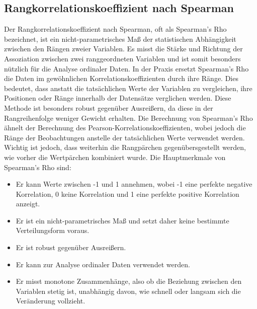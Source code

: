 \subsection{Rangkorrelationskoeffizient nach Spearman}
Der Rangkorrelationskoeffizient nach Spearman, oft als Spearman's Rho bezeichnet, ist ein nicht-parametrisches Maß der statistischen Abhängigkeit zwischen den Rängen zweier Variablen.
Es misst die Stärke und Richtung der Assoziation zwischen zwei ranggeordneten Variablen und ist somit besonders nützlich für die Analyse ordinaler Daten.
\newline
In der Praxis ersetzt Spearman's Rho die Daten im gewöhnlichen Korrelationskoeffizienten durch ihre Ränge.
Dies bedeutet, dass anstatt die tatsächlichen Werte der Variablen zu vergleichen, ihre Positionen oder Ränge innerhalb der Datensätze verglichen werden.
Diese Methode ist besonders robust gegenüber Ausreißern, da diese in der Rangreihenfolge weniger Gewicht erhalten.
\newline
Die Berechnung von Spearman's Rho ähnelt der Berechnung des Pearson-Korrelationskoeffizienten, wobei jedoch die Ränge der Beobachtungen anstelle der tatsächlichen Werte verwendet werden.
Wichtig ist jedoch, dass weiterhin die Rangpärchen gegenübersgestellt werden, wie vorher die Wertpärchen kombiniert wurde.
\newline \newline
Die Hauptmerkmale von Spearman's Rho sind:
\begin{itemize}
    \item Er kann Werte zwischen -1 und 1 annehmen, wobei -1 eine perfekte negative Korrelation, 0 keine Korrelation und 1 eine perfekte positive Korrelation anzeigt.
    \item Er ist ein nicht-parametrisches Maß und setzt daher keine bestimmte Verteilungsform voraus.
    \item Er ist robust gegenüber Ausreißern.
    \item Er kann zur Analyse ordinaler Daten verwendet werden.
    \item Er misst monotone Zusammenhänge, also ob die Beziehung zwischen den Variablen stetig ist, unabhängig davon, wie schnell oder langsam sich die Veränderung vollzieht.
\end{itemize}

